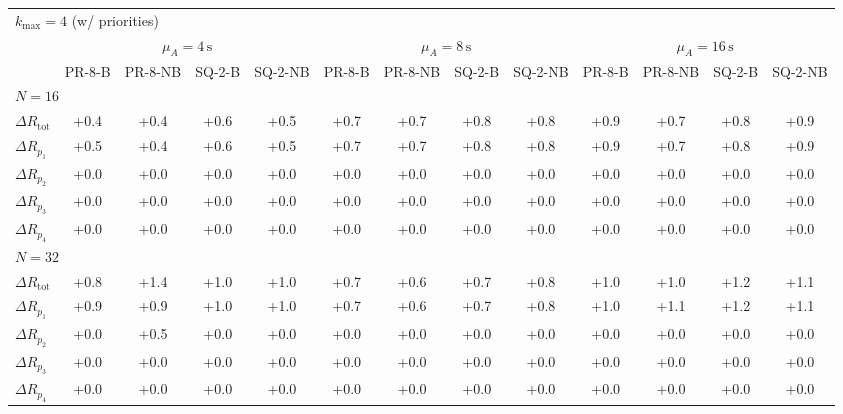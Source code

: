 \begin{tabular}{l c c c c c c c c c c c c}
\toprule
\multicolumn{13}{l}{$k_{\max}=4$ (w/ priorities)} \\
\addlinespace[0.2em]
 & \multicolumn{4}{c}{$\mu_A=4\,\mathrm{s}$} & \multicolumn{4}{c}{$\mu_A=8\,\mathrm{s}$} & \multicolumn{4}{c}{$\mu_A=16\,\mathrm{s}$} \\
\cmidrule(lr){2-5}\cmidrule(lr){6-9}\cmidrule(lr){10-13}
 & PR-8-B & PR-8-NB & SQ-2-B & SQ-2-NB & PR-8-B & PR-8-NB & SQ-2-B & SQ-2-NB & PR-8-B & PR-8-NB & SQ-2-B & SQ-2-NB \\
\midrule
\multicolumn{13}{l}{${N=16}$} \\
\midrule
$\Delta R_{\mathrm{tot}}$ & +0.4 & +0.4 & +0.6 & +0.5 & +0.7 & +0.7 & +0.8 & +0.8 & +0.9 & +0.7 & +0.8 & +0.9 \\
$\Delta R_{p_1}$ & +0.5 & +0.4 & +0.6 & +0.5 & +0.7 & +0.7 & +0.8 & +0.8 & +0.9 & +0.7 & +0.8 & +0.9 \\
$\Delta R_{p_2}$ & +0.0 & +0.0 & +0.0 & +0.0 & +0.0 & +0.0 & +0.0 & +0.0 & +0.0 & +0.0 & +0.0 & +0.0 \\
$\Delta R_{p_3}$ & +0.0 & +0.0 & +0.0 & +0.0 & +0.0 & +0.0 & +0.0 & +0.0 & +0.0 & +0.0 & +0.0 & +0.0 \\
$\Delta R_{p_4}$ & +0.0 & +0.0 & +0.0 & +0.0 & +0.0 & +0.0 & +0.0 & +0.0 & +0.0 & +0.0 & +0.0 & +0.0 \\
\midrule
\multicolumn{13}{l}{${N=32}$} \\
\midrule
$\Delta R_{\mathrm{tot}}$ & +0.8 & +1.4 & +1.0 & +1.0 & +0.7 & +0.6 & +0.7 & +0.8 & +1.0 & +1.0 & +1.2 & +1.1 \\
$\Delta R_{p_1}$ & +0.9 & +0.9 & +1.0 & +1.0 & +0.7 & +0.6 & +0.7 & +0.8 & +1.0 & +1.1 & +1.2 & +1.1 \\
$\Delta R_{p_2}$ & +0.0 & +0.5 & +0.0 & +0.0 & +0.0 & +0.0 & +0.0 & +0.0 & +0.0 & +0.0 & +0.0 & +0.0 \\
$\Delta R_{p_3}$ & +0.0 & +0.0 & +0.0 & +0.0 & +0.0 & +0.0 & +0.0 & +0.0 & +0.0 & +0.0 & +0.0 & +0.0 \\
$\Delta R_{p_4}$ & +0.0 & +0.0 & +0.0 & +0.0 & +0.0 & +0.0 & +0.0 & +0.0 & +0.0 & +0.0 & +0.0 & +0.0 \\
\bottomrule
\end{tabular}
